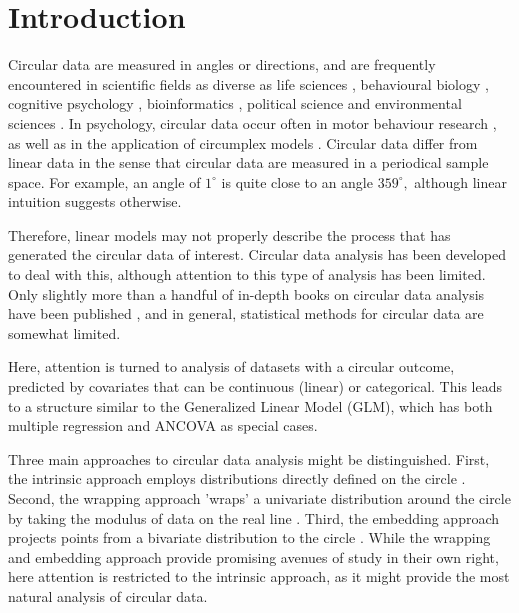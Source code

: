\section{Introduction}

Circular data are measured in angles or directions, and are frequently encountered in scientific fields as diverse as life sciences \citep{mardianew}, behavioural biology \citep{bulbert2015danger}, cognitive psychology \citep{kaas2006haptic}, bioinformatics \citep{mardia2008multivariate}, political science \citep{gill2010} and environmental sciences \citep{lagona2016regression, lagona2015hidden, arnold2006recent}. In psychology, circular data occur often in motor behaviour research \citep{mechsner2001perceptual, mechsner2007bimanual, postma2008keep, baayen2012test}, as well as in the application of circumplex models \citep{Leary1957, gurtman2003circumplex, gurtman2009exploring}. Circular data differ from linear data in the sense that circular data are measured in a periodical sample space. For example, an angle of $1^{\circ}$ is quite close to an angle $359^{\circ},$ although linear intuition suggests otherwise.

Therefore, linear models may not properly describe the process that has generated the circular data of interest. Circular data analysis has been developed to deal with this, although attention to this type of analysis has been limited. Only slightly more than a handful of in-depth books on circular data analysis have been published \citep{fisher1995statistical, mardia1999directional, pewsey2013circular, jammalamadaka2001topics}, and in general, statistical methods for circular data are somewhat limited.

Here, attention is turned to analysis of datasets with a circular outcome, predicted by covariates that can be continuous (linear) or categorical. This leads to a structure similar to the Generalized Linear Model (GLM), which has both multiple regression and ANCOVA as special cases.

Three main approaches to circular data analysis might be distinguished. First, the intrinsic approach employs distributions directly defined on the circle  \citep{fisher1992regression, artes2008hypothesis}. Second, the wrapping approach 'wraps' a univariate distribution around the circle by taking the modulus of data on the real line \citep{ferrari2009wrapping, coles1998inference}. Third, the embedding approach projects points from a bivariate distribution to the circle \citep{nunez2011bayesian, nunez2014bayesian, wang2014modeling, hernandez2015general, maruotti2016analyzing}. While the wrapping and embedding approach provide promising avenues of study in their own right, here attention is restricted to the intrinsic approach, as it might provide the most natural analysis of circular data.

